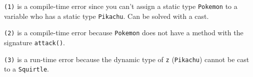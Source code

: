 \begin{solution}
\lstinline$(1)$ is a compile-time error since you can't assign a static type
\lstinline$Pokemon$ to a variable who has a static type \lstinline$Pikachu$.
Can be solved with a cast.

\lstinline$(2)$ is a compile-time error because \lstinline$Pokemon$ does not
have a method with the signature \lstinline$attack()$.

\lstinline$(3)$ is a run-time error because the dynamic type of \lstinline$z$
(\lstinline$Pikachu$) cannot be cast to a \lstinline$Squirtle$.
\end{solution}
